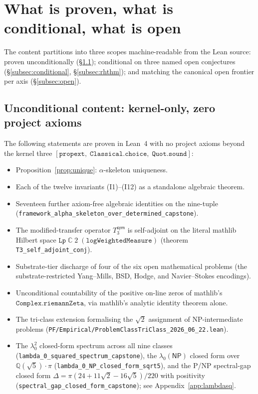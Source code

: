 \documentclass[11pt,a4paper]{amsart}
\theoremstyle{plain}
\theoremstyle{definition}
\begin{document}
\section{What is proven, what is conditional, what is open}\label{sec:scope}

The content partitions into three scopes machine-readable from the Lean source: proven unconditionally (\S\ref{subsec:unconditional}); conditional on three named open conjectures (\S\ref{subsec:conditional}, \S\ref{subsec:rhthm}); and matching the canonical open frontier per axis (\S\ref{subsec:open}).

\subsection{Unconditional content: kernel-only, zero project axioms}\label{subsec:unconditional}

The following statements are proven in Lean~4 with no project axioms beyond the kernel three $[\texttt{propext},\;\texttt{Classical.choice},\;\texttt{Quot.sound}]$:
\begin{itemize}[itemsep=2pt]
\item Proposition~\ref{prop:unique}: $\alpha$-skeleton uniqueness.
\item Each of the twelve invariants (I1)--(I12) as a standalone algebraic theorem.
\item Seventeen further axiom-free algebraic identities on the nine-tuple (\texttt{framework\_alpha\_skeleton\_over\_determined\_capstone}).
\item The modified-transfer operator $T_3^{\textsf{sym}}$ is self-adjoint on the literal mathlib Hilbert space $\texttt{Lp}\;\mathbb{C}\;2\;(\texttt{logWeightedMeasure})$ (theorem \texttt{T3\_self\_adjoint\_conj}).
\item Substrate-tier discharge of four of the six open mathematical problems (the substrate-restricted Yang--Mills, BSD, Hodge, and Navier--Stokes encodings).
\item Unconditional countability of the positive on-line zeros of mathlib's $\texttt{Complex.riemannZeta}$, via mathlib's analytic identity theorem alone.
\item The tri-class extension formalising the $\sqrt{2}$ assignment of NP-intermediate problems (\texttt{PF/Empirical/ProblemClassTriClass\_2026\_06\_22.lean}).
\item The $\lambda_0^2$ closed-form spectrum across all nine classes (\texttt{lambda\_0\_squared\_spectrum\_capstone}), the $\lambda_0(\textsf{NP})$ closed form over $\mathbb{Q}(\sqrt{5})\cdot\pi$ (\texttt{lambda\_0\_NP\_closed\_form\_sqrt5}), and the P/NP spectral-gap closed form $\Delta = \pi(24 + 11\sqrt{2} - 16\sqrt{5})/220$ with positivity (\texttt{spectral\_gap\_closed\_form\_capstone}); see Appendix~\ref{app:lambdasq}.
\end{itemize}
\end{document}
